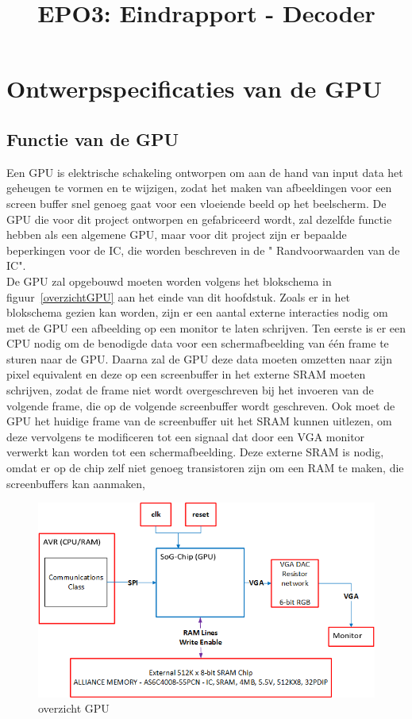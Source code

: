 \documentclass{scrartcl} %
\author{}
\title{EPO3: Eindrapport - Decoder}
\begin{document}
\chapter{Ontwerpspecificaties van de GPU}
\label{ch:spec}

\section {Functie van de GPU}
Een GPU is elektrische schakeling ontworpen om aan de hand van input data het geheugen te vormen en te wijzigen, zodat het maken van afbeeldingen voor een screen buffer snel genoeg gaat voor een vloeiende beeld op het beelscherm. De GPU die voor  dit project ontworpen en gefabriceerd wordt, zal dezelfde functie hebben als een algemene GPU, maar voor dit project zijn er bepaalde beperkingen voor de IC, die worden beschreven in de " Randvoorwaarden van de IC".
\\De GPU zal opgebouwd moeten worden volgens het blokschema in figuur~\ref{overzichtGPU} aan het einde van dit hoofdstuk.
Zoals er in het blokschema gezien kan worden, zijn er een aantal externe interacties nodig om met de GPU een afbeelding op een monitor te laten schrijven. Ten eerste is er een CPU nodig om de benodigde data voor een schermafbeelding van één frame te sturen naar de GPU. Daarna zal de GPU deze data moeten omzetten naar zijn pixel equivalent en deze op een screenbuffer in het externe SRAM moeten schrijven, zodat de frame niet wordt overgeschreven bij het invoeren van de volgende frame, die op de volgende screenbuffer wordt geschreven. Ook moet de GPU het huidige frame van de screenbuffer uit het SRAM kunnen uitlezen, om deze vervolgens te modificeren tot een signaal dat door een VGA monitor verwerkt kan worden tot een schermafbeelding. Deze externe SRAM is nodig, omdat er op de chip zelf niet genoeg transistoren zijn om een RAM te maken, die screenbuffers kan aanmaken,
\begin{figure}[H]
\centering
        \includegraphics[scale=0.7]{Resource/system_overview.png}
        \caption{overzicht GPU}
        \label{fig:overzichtGPU}
\end{figure} 
\end{document}
